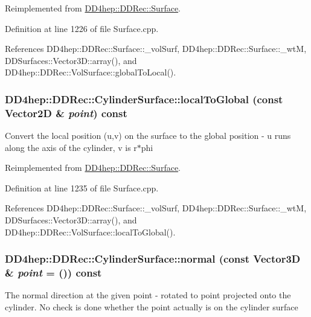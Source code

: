 Reimplemented from \hyperlink{class_d_d4hep_1_1_d_d_rec_1_1_surface_a3c42b99943d5670d31ee67a90bdbafbd}{DD4hep::DDRec::Surface}.

Definition at line 1226 of file Surface.cpp.

References DD4hep::DDRec::Surface::\_\-volSurf, DD4hep::DDRec::Surface::\_\-wtM, DDSurfaces::Vector3D::array(), and DD4hep::DDRec::VolSurface::globalToLocal().\hypertarget{class_d_d4hep_1_1_d_d_rec_1_1_cylinder_surface_a175adc46f395f0795e4aad32147516fa}{
\subsubsection[{localToGlobal}]{ DD4hep::DDRec::CylinderSurface::localToGlobal (const {\bf Vector2D} \& {\em point}) const}}
\label{class_d_d4hep_1_1_d_d_rec_1_1_cylinder_surface_a175adc46f395f0795e4aad32147516fa}
Convert the local position (u,v) on the surface to the global position -\/ u runs along the axis of the cylinder, v is r$\ast$phi 

Reimplemented from \hyperlink{class_d_d4hep_1_1_d_d_rec_1_1_surface_ad5107e6eed2e092460a69530258b4852}{DD4hep::DDRec::Surface}.

Definition at line 1235 of file Surface.cpp.

References DD4hep::DDRec::Surface::\_\-volSurf, DD4hep::DDRec::Surface::\_\-wtM, DDSurfaces::Vector3D::array(), and DD4hep::DDRec::VolSurface::localToGlobal().\hypertarget{class_d_d4hep_1_1_d_d_rec_1_1_cylinder_surface_a42de2f110f904bf4d4862bd0b149d49a}{
\subsubsection[{normal}]{ DD4hep::DDRec::CylinderSurface::normal (const {\bf Vector3D} \& {\em point} = {()}) const}}
\label{class_d_d4hep_1_1_d_d_rec_1_1_cylinder_surface_a42de2f110f904bf4d4862bd0b149d49a}
The normal direction at the given point -\/ rotated to point projected onto the cylinder. No check is done whether the point actually is on the cylinder surface 

